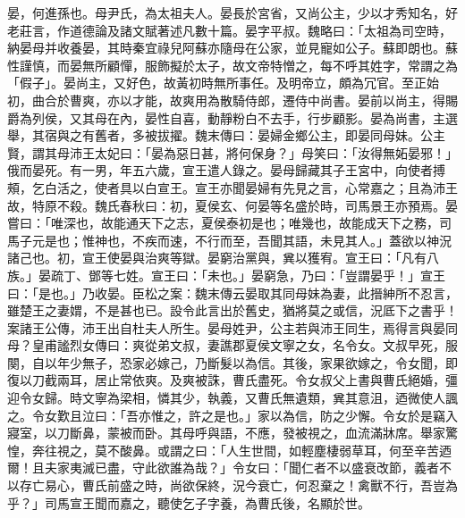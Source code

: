 \begin{pinyinscope}
晏，何進孫也。母尹氏，為太祖夫人。晏長於宮省，又尚公主，少以才秀知名，好老莊言，作道德論及諸文賦著述凡數十篇。晏字平叔。魏略曰：「太祖為司空時，納晏母并收養晏，其時秦宜祿兒阿蘇亦隨母在公家，並見寵如公子。蘇即朗也。蘇性謹慎，而晏無所顧憚，服飾擬於太子，故文帝特憎之，每不呼其姓字，常謂之為「假子」。晏尚主，又好色，故黃初時無所事任。及明帝立，頗為冗官。至正始初，曲合於曹爽，亦以才能，故爽用為散騎侍郎，遷侍中尚書。晏前以尚主，得賜爵為列侯，又其母在內，晏性自喜，動靜粉白不去手，行步顧影。晏為尚書，主選舉，其宿與之有舊者，多被拔擢。魏末傳曰：晏婦金鄉公主，即晏同母妹。公主賢，謂其母沛王太妃曰：「晏為惡日甚，將何保身？」母笑曰：「汝得無妬晏邪！」俄而晏死。有一男，年五六歲，宣王遣人錄之。晏母歸藏其子王宮中，向使者搏頰，乞白活之，使者具以白宣王。宣王亦聞晏婦有先見之言，心常嘉之；且為沛王故，特原不殺。魏氏春秋曰：初，夏侯玄、何晏等名盛於時，司馬景王亦預焉。晏嘗曰：「唯深也，故能通天下之志，夏侯泰初是也；唯幾也，故能成天下之務，司馬子元是也；惟神也，不疾而速，不行而至，吾聞其語，未見其人。」蓋欲以神況諸己也。初，宣王使晏與治爽等獄。晏窮治黨與，兾以獲宥。宣王曰：「凡有八族。」晏疏丁、鄧等七姓。宣王曰：「未也。」晏窮急，乃曰：「豈謂晏乎！」宣王曰：「是也。」乃收晏。臣松之案：魏末傳云晏取其同母妹為妻，此搢紳所不忍言，雖楚王之妻媦，不是甚也已。設令此言出於舊史，猶將莫之或信，況厎下之書乎！案諸王公傳，沛王出自杜夫人所生。晏母姓尹，公主若與沛王同生，焉得言與晏同母？皇甫謐烈女傳曰：爽從弟文叔，妻譙郡夏侯文寧之女，名令女。文叔早死，服闋，自以年少無子，恐家必嫁己，乃斷髮以為信。其後，家果欲嫁之，令女聞，即復以刀截兩耳，居止常依爽。及爽被誅，曹氏盡死。令女叔父上書與曹氏絕婚，彊迎令女歸。時文寧為梁相，憐其少，執義，又曹氏無遺類，兾其意沮，迺微使人諷之。令女歎且泣曰：「吾亦惟之，許之是也。」家以為信，防之少懈。令女於是竊入寢室，以刀斷鼻，蒙被而卧。其母呼與語，不應，發被視之，血流滿牀席。舉家驚惶，奔往視之，莫不酸鼻。或謂之曰：「人生世間，如輕塵棲弱草耳，何至辛苦迺爾！且夫家夷滅已盡，守此欲誰為哉？」令女曰：「聞仁者不以盛衰改節，義者不以存亡易心，曹氏前盛之時，尚欲保終，況今衰亡，何忍棄之！禽獸不行，吾豈為乎？」司馬宣王聞而嘉之，聽使乞子字養，為曹氏後，名顯於世。


\end{pinyinscope}